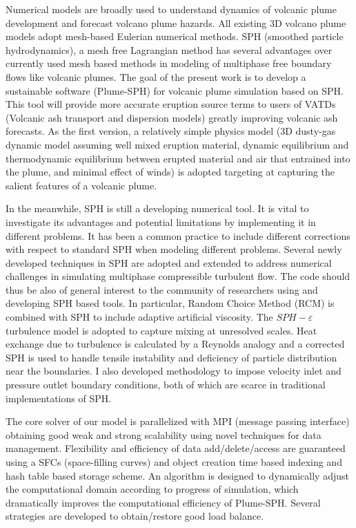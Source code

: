 Numerical models are broadly used to understand dynamics of volcanic plume development and forecast volcano plume hazards. All existing 3D volcano plume models adopt mesh-based Eulerian numerical methods. 
SPH (smoothed particle hydrodynamics), a mesh free Lagrangian method has several advantages over currently used mesh based methods in modeling of multiphase free boundary flows like volcanic plumes. The goal of the present work is to develop a sustainable software (Plume-SPH) for volcanic plume simulation based on SPH.
This tool will provide more accurate eruption source terms to users of VATDs (Volcanic ash transport and dispersion models) greatly improving volcanic ash forecasts.
As the first version, a relatively simple physics model (3D dusty-gas dynamic model assuming well mixed eruption material, dynamic equilibrium and thermodynamic equilibrium between erupted material and air that entrained into the plume, and minimal effect of winds) is adopted targeting at capturing the salient features of a volcanic plume. 
 
In the meanwhile, SPH is still a developing numerical tool. It is vital to investigate its advantages and potential limitations by implementing it in different problems. It has been a common practice to include different corrections with respect to standard SPH when modeling different problems. Several newly developed techniques in SPH are adopted and extended to address numerical challenges in simulating multiphase compressible turbulent flow. The code should thus be also of general interest to the community of researchers using and developing SPH based tools. In particular, Random Choice Method (RCM) is combined with SPH to include adaptive artificial viscosity. The $SPH-\varepsilon$ turbulence model is adopted to capture mixing at unresolved scales. Heat exchange due to turbulence is calculated by a Reynolds analogy and a corrected SPH is used to handle tensile instability and deficiency of particle distribution near the boundaries. I also developed methodology to impose velocity inlet and pressure outlet boundary conditions, both of which are scarce in traditional implementations of SPH.

The core solver of our model is parallelized with MPI (message passing interface) obtaining good weak and strong scalability using novel techniques for data management. Flexibility and efficiency of data add/delete/access are guaranteed using a SFCs (space-filling curves) and object creation time based indexing and hash table based storage scheme. An algorithm is designed to dynamically adjust the computational domain according to progress of simulation, which dramatically improves the computational efficiency of Plume-SPH. Several strategies are developed to obtain/restore good load balance.

